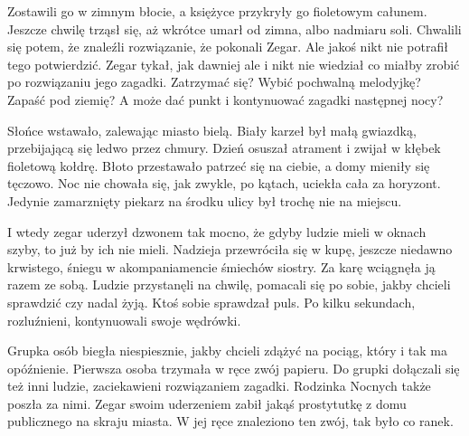 Zostawili go w zimnym błocie, a księżyce przykryły go fioletowym całunem.
Jeszcze chwilę trząsł się, aż wkrótce umarł od zimna, albo nadmiaru soli.
Chwalili się potem, że znaleźli rozwiązanie, że pokonali Zegar.
Ale jakoś nikt nie potrafił tego potwierdzić. 
Zegar tykał, jak dawniej ale i nikt nie wiedział co miałby zrobić po rozwiązaniu jego zagadki.
Zatrzymać się? Wybić pochwalną melodyjkę? Zapaść pod ziemię? A może dać punkt i kontynuować zagadki następnej nocy?

Słońce wstawało, zalewając miasto bielą.
Biały karzeł był małą gwiazdką, przebijającą się ledwo przez chmury.
Dzień osuszał atrament i zwijał w kłębek fioletową kołdrę.
Błoto przestawało patrzeć się na ciebie, a domy mieniły się tęczowo.
Noc nie chowała się, jak zwykle, po kątach, uciekła cała za horyzont.
Jedynie zamarznięty piekarz na środku ulicy był trochę nie na miejscu.

I wtedy zegar uderzył dzwonem tak mocno, że gdyby ludzie mieli w oknach szyby, to już by ich nie mieli.
Nadzieja przewróciła się w kupę, jeszcze niedawno krwistego, śniegu w akompaniamencie śmiechów siostry.
Za karę wciągnęła ją razem ze sobą.
Ludzie przystanęli na chwilę, pomacali się po sobie, jakby chcieli sprawdzić czy nadal żyją.
Ktoś sobie sprawdzał puls.
Po kilku sekundach, rozluźnieni, kontynuowali swoje wędrówki.

Grupka osób biegła niespiesznie, jakby chcieli zdążyć na pociąg, który i tak ma opóźnienie.
Pierwsza osoba trzymała w ręce zwój papieru.
Do grupki dołączali się też inni ludzie, zaciekawieni rozwiązaniem zagadki.
Rodzinka Nocnych także poszła za nimi.
Zegar swoim uderzeniem zabił jakąś prostytutkę z domu publicznego na skraju miasta.
W jej ręce znaleziono ten zwój, tak było co ranek.


